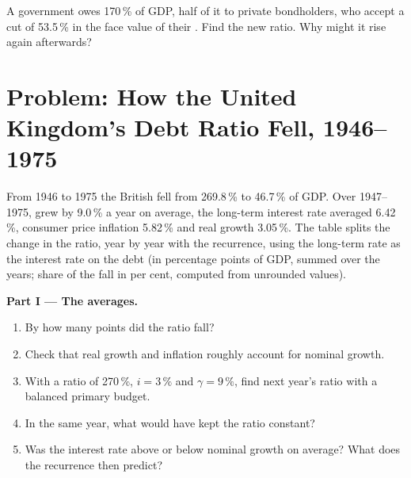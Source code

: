 \begin{exercise}[$\star\star\star$]\label{exo:g12:fiscal-policy-and-debt:15}
A government owes 170\,\% of GDP, half of it to private bondholders, who accept a cut of 53.5\,\% in the face value of their . Find the new ratio. Why might it rise again
afterwards?
\end{exercise}

\section{Problem: How the United Kingdom's Debt Ratio Fell, 1946--1975}

\begin{problem}
\label{pb:g12:fiscal-policy-and-debt:1}
From 1946 to 1975 the British  fell from 269.8\,\% to 46.7\,\% of GDP. Over 1947--1975,  grew by 9.0\,\% a year on average, the long-term interest rate
averaged 6.42\,\%, consumer price inflation 5.82\,\% and real growth 3.05\,\%. The table splits the change in the ratio, year by year with the recurrence, using the long-term
rate as the interest rate on the debt (in percentage points of GDP, summed over the years; share of the fall in per cent, computed from unrounded
values).

\medskip
\begin{center}
\small
{}
\end{center}

\medskip
\noindent\textbf{Part I --- The averages.}
\begin{enumerate}
\item By how many points did the ratio fall?
\item Check that real growth and inflation roughly account for nominal growth.
\item With a ratio of 270\,\%, $i = 3\,\%$ and $\gamma = 9\,\%$, find next year's ratio with a balanced primary budget.
\item In the same year, what  would have kept the ratio constant?
\item Was the interest rate above or below nominal growth on average? What does the recurrence then predict?
\end{enumerate}


\end{problem}
